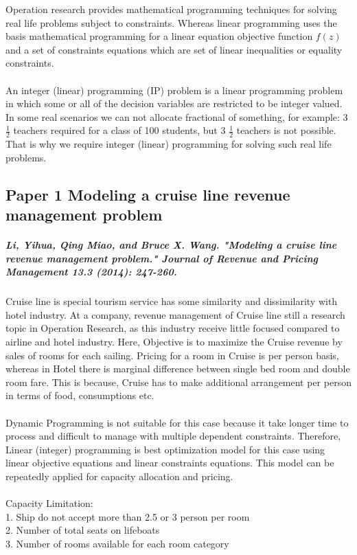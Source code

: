 \documentclass[paper=a4, fontsize=11pt]{scrartcl} %
\begin{document}
Operation research provides mathematical programming techniques for solving real life problems subject to constraints. Whereas linear programming uses the basis mathematical programming for a linear equation objective function $f(z)$ and a set of constraints equations which are set of linear inequalities or equality  constraints.
\\
\\
An integer (linear) programming (IP) problem is a linear programming problem in which some or all of the decision variables are restricted to be integer valued. In some real scenarios we can not allocate fractional of something, for example: 3 $\frac{1}{2}$ teachers required for a class of 100 students, but 3 $\frac{1}{2}$ teachers is not possible. That is why we require integer (linear) programming for solving such real life problems.
\\

\subsection{Paper 1 Modeling a cruise line revenue management problem}
\subparagraph{Li, Yihua, Qing Miao, and Bruce X. Wang. "Modeling a cruise line revenue management problem." Journal of Revenue and Pricing Management 13.3 (2014): 247-260.}
Cruise line is special tourism service has some similarity and dissimilarity with hotel industry. At a company, revenue management of Cruise line still a research topic in Operation Research, as this industry receive little focused compared to airline and hotel industry. Here, Objective is to maximize the Cruise revenue by sales of rooms for each sailing. Pricing for a room in Cruise is per person basis, whereas in Hotel there is marginal difference between single bed room and double room fare. This is because, Cruise has to make additional arrangement per person in terms of food, consumptions etc.
\\
\\
Dynamic Programming is not suitable for this case because it take longer time to process and difficult to manage with multiple dependent constraints. Therefore, Linear (integer) programming is best optimization model for this case using linear objective equations and linear constraints equations. This model can be repeatedly applied for capacity allocation and pricing.
\\
\\
Capacity Limitation:\\
1. Ship do not accept more than 2.5 or 3 person per room\\
2. Number of total seats on lifeboats\\
3. Number of rooms available for each room category\\
\end{document}
